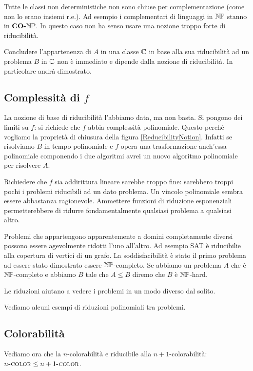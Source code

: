 Tutte le classi non deterministiche non sono chiuse per complementazione (come non lo erano insiemi
r.e.). Ad esempio i complementari di linguaggi in $\mathbb{NP}$ stanno in $\textbf{CO-}\mathbb{NP}$. In questo caso
non ha senso usare una nozione troppo forte di riducibilità.

Concludere l'appartenenza di $A$ in una classe $\mathbb{C}$ in base alla sua riducibilità ad un
problema $B$ in $\mathbb{C}$ non è immediato e dipende dalla nozione di riducibilità. In particolare
andrà dimostrato.

\subsection{Complessità di $f$}

La nozione di base di riducibilità l'abbiamo data, ma non basta. Si pongono dei limiti su $f$: si
richiede che $f$ abbia complessità polinomiale. Questo perché vogliamo la proprietà di chiusura
della figura \ref{ReducibilityNotion}. Infatti se risolviamo $B$ in tempo polinomiale e $f$ opera
una trasformazione anch'essa polinomiale componendo i due algoritmi avrei un nuovo algoritmo
polinomiale per risolvere $A$.

Richiedere che $f$ sia addirittura lineare sarebbe troppo fine: sarebbero troppi pochi i problemi
riducibili ad un dato problema. Un vincolo polinomiale sembra essere abbastanza ragionevole.
Ammettere funzioni di riduzione esponenziali permetterebbere di ridurre fondamentalmente qualsiasi
problema a qualsiasi altro.

Problemi che appartengono apparentemente a domini completamente diversi possono essere agevolmente
ridotti l'uno all'altro. Ad esempio SAT è riducibilie alla copertura di vertici di un grafo. La
soddisfacibilità è stato il primo problema ad essere stato dimostrato essere $\mathbb{NP}$-completo. Se
abbiamo un problema $A$ che è $\mathbb{NP}$-completo e abbiamo $B$ tale che $A \leq B$ diremo che $B$
è $\mathbb{NP}$-hard.

Le riduzioni aiutano a vedere i problemi in un modo diverso dal solito.

Vediamo alcuni esempi di riduzioni polinomiali tra problemi.

\subsection{Colorabilità}

Vediamo ora che la $n$-colorabilità e riducibile alla $n+1$-colorabilità: $n\textsc{-color} \leq
n+1\textsc{-color}$.

